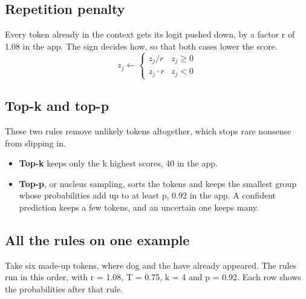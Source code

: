 \documentclass[11pt,a4paper]{article}
\newcommand{\vs}{\textvisiblespace}
\begin{document}
\subsection*{Repetition penalty}
{}

Every token already in the context gets its logit pushed down, by a factor r of 1.08 in the app. The sign decides how, so that both cases lower the score.
\[
z_j \leftarrow \begin{cases} z_j / r & z_j \ge 0 \\ z_j \cdot r & z_j < 0 \end{cases}
\]

\subsection*{Top-k and top-p}
{}

These two rules remove unlikely tokens altogether, which stops rare nonsense from slipping in.

\begin{itemize}
\item \textbf{Top-k} keeps only the k highest scores, 40 in the app.
\item \textbf{Top-p}, or nucleus sampling, sorts the tokens and keeps the smallest group whose probabilities add up to at least p, 0.92 in the app. A confident prediction keeps a few tokens, and an uncertain one keeps many.
\end{itemize}

\subsection*{All the rules on one example}
{}

Take six made-up tokens, where \vs{}dog and \vs{}the have already appeared. The rules run in this order, with r = 1.08, T = 0.75, k = 4 and p = 0.92. Each row shows the probabilities after that rule.
\end{document}

